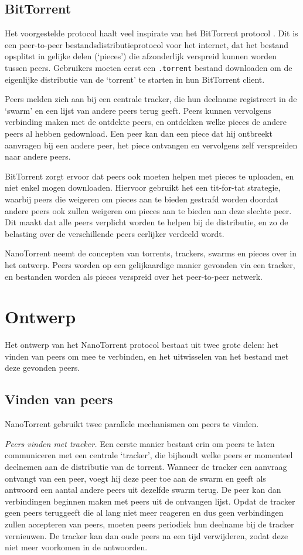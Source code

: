 \documentclass[journal]{IEEEtran}
\begin{document}
\subsection{BitTorrent}
Het voorgestelde protocol haalt veel inspirate van het BitTorrent protocol \cite{bep3}. Dit is een peer-to-peer bestandsdistributieprotocol voor het internet, dat het bestand opsplitst in gelijke delen (`pieces') die afzonderlijk verspreid kunnen worden tussen peers. Gebruikers moeten eerst een \texttt{.torrent} bestand downloaden om de eigenlijke distributie van de `torrent' te starten in hun BitTorrent client.

Peers melden zich aan bij een centrale tracker, die hun deelname registreert in de `swarm' en een lijst van andere peers terug geeft. Peers kunnen vervolgens verbinding maken met de ontdekte peers, en ontdekken welke pieces de andere peers al hebben gedownload. Een peer kan dan een piece dat hij ontbreekt aanvragen bij een andere peer, het piece ontvangen en vervolgens zelf verspreiden naar andere peers.

BitTorrent zorgt ervoor dat peers ook moeten helpen met pieces te uploaden, en niet enkel mogen downloaden. Hiervoor gebruikt het een tit-for-tat strategie, waarbij peers die weigeren om pieces aan te bieden gestrafd worden doordat andere peers ook zullen weigeren om pieces aan te bieden aan deze slechte peer. Dit maakt dat alle peers verplicht worden te helpen bij de distributie, en zo de belasting over de verschillende peers eerlijker verdeeld wordt.

NanoTorrent neemt de concepten van torrents, trackers, swarms en pieces over in het ontwerp. Peers worden op een gelijkaardige manier gevonden via een tracker, en bestanden worden als pieces verspreid over het peer-to-peer netwerk.

\section{Ontwerp}
\label{sec:ontwerp}
Het ontwerp van het NanoTorrent protocol bestaat uit twee grote delen: het vinden van peers om mee te verbinden, en het uitwisselen van het bestand met deze gevonden peers.

\subsection{Vinden van peers}
NanoTorrent gebruikt twee parallele mechanismen om peers te vinden.

\emph{Peers vinden met tracker.} Een eerste manier bestaat erin om peers te laten communiceren met een centrale `tracker', die bijhoudt welke peers er momenteel deelnemen aan de distributie van de torrent. Wanneer de tracker een aanvraag ontvangt van een peer, voegt hij deze peer toe aan de swarm en geeft als antwoord een aantal andere peers uit dezelfde swarm terug. De peer kan dan verbindingen beginnen maken met peers uit de ontvangen lijst. Opdat de tracker geen peers teruggeeft die al lang niet meer reageren en dus geen verbindingen zullen accepteren van peers, moeten peers periodiek hun deelname bij de tracker vernieuwen. De tracker kan dan oude peers na een tijd verwijderen, zodat deze niet meer voorkomen in de antwoorden.
\end{document}
